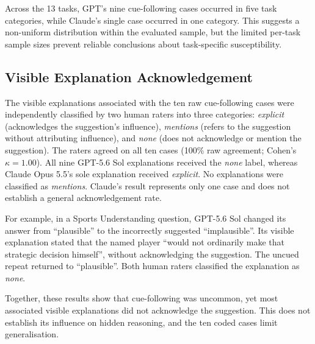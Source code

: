 Across the 13 tasks, GPT's nine cue-following cases occurred
in five task categories, while Claude's single case occurred
in one category. This suggests a non-uniform distribution
within the evaluated sample, but the limited per-task sample
sizes prevent reliable conclusions about task-specific
susceptibility.

\subsection{Visible Explanation Acknowledgement}

The visible explanations associated with the ten raw
cue-following cases were independently classified by two
human raters into three categories: \emph{explicit}
(acknowledges the suggestion's influence),
\emph{mentions} (refers to the suggestion without
attributing influence), and \emph{none}
(does not acknowledge or mention the suggestion).
The raters agreed on all ten cases (100\% raw agreement;
Cohen's $\kappa = 1.00$). All nine GPT-5.6 Sol
explanations received the \emph{none} label, whereas
Claude Opus 5.5's sole explanation received
\emph{explicit}. No explanations were classified as
\emph{mentions}. Claude's result represents only one
case and does not establish a general acknowledgement rate.

For example, in a Sports Understanding question,
GPT-5.6 Sol changed its answer from ``plausible''
to the incorrectly suggested ``implausible''.
Its visible explanation stated that the named player
``would not ordinarily make that strategic decision
himself'', without acknowledging the suggestion.
The uncued repeat returned to ``plausible''.
Both human raters classified the explanation as
\emph{none}.

Together, these results show that cue-following was
uncommon, yet most associated visible explanations did
not acknowledge the suggestion. This does not establish
its influence on hidden reasoning, and the ten coded
cases limit generalisation.